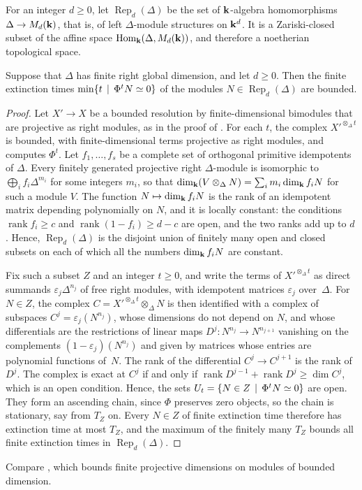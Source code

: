 For an integer ${d\geq0}$, let $\operatorname{Rep}_d(\Delta)$ be the set of
$\mathbf{k}$-algebra homomorphisms ${\Delta\to M_d(\mathbf{k})}$, that is, of left
$\Delta$-module structures on $\mathbf{k}^d$. It is a Zariski-closed subset of the
affine space $\Hom[\kk]{\Delta}{M_d(\kk)}$, and therefore a noetherian
topological space.

\begin{proposition}
  \label{prop:bounded-extinction}
  Suppose that $\Delta$ has finite right global dimension, and let ${d\geq0}$.
  Then the finite extinction times ${\min\set{t}[\Phi^tN\simeq0]}$ of the modules
  ${N\in\operatorname{Rep}_d(\Delta)}$ are bounded.
\end{proposition}

\begin{proof}
  Let ${X'\to X}$ be a bounded resolution by finite-dimensional bimodules that
  are projective as right modules, as in the proof of .
  For each $t$, the complex $X'^{\otimes_\Delta t}$ is bounded, with
  finite-dimensional terms projective as right modules, and computes $\Phi^t$.
  Let $f_1,\dots,f_s$ be a complete set of orthogonal primitive idempotents of
  $\Delta$. Every finitely generated projective right $\Delta$-module is
  isomorphic to $\bigoplus_if_i\Delta^{m_i}$ for some integers $m_i$, so that
  ${\dim_{\mathbf{k}}(V\otimes_\Delta N)}={\sum_im_i\dim_{\mathbf{k}} f_iN}$ for such a module $V$.
  The function ${N}\mapsto{\dim_{\mathbf{k}}f_iN}$ is the rank of an idempotent matrix
  depending polynomially on $N$, and it is locally constant: the conditions
  ${\operatorname{rank}f_i\geq c}$ and ${\operatorname{rank}(1-f_i)\geq d-c}$ are
  open, and the two ranks add up to $d$. Hence, $\operatorname{Rep}_d(\Delta)$
  is the disjoint union of finitely many open and closed subsets on each of
  which all the numbers $\dim_{\mathbf{k}} f_iN$ are constant.

  Fix such a subset $Z$ and an integer ${t\geq0}$, and write the terms of
  $X'^{\otimes_\Delta t}$ as direct summands $\varepsilon_j\Delta^{n_j}$ of free
  right modules, with idempotent matrices $\varepsilon_j$ over~$\Delta$. For
  ${N\in Z}$, the complex ${C=X'^{\otimes_\Delta t}\otimes_\Delta N}$ is then
  identified with a complex of subspaces ${C^j=\varepsilon_j(N^{n_j})}$, whose
  dimensions do not depend on $N$, and whose differentials are the restrictions
  of linear maps ${D^j\colon N^{n_j}\to N^{n_{j+1}}}$ vanishing on the
  complements ${(1-\varepsilon_j)(N^{n_j})}$ and given by matrices whose entries
  are polynomial functions of~$N$. The rank of the differential ${C^j\to
  C^{j+1}}$ is the rank of $D^j$. The complex is exact at $C^j$ if and only if
  ${\operatorname{rank}D^{j-1}+\operatorname{rank}D^j\geq\dim C^j}$, which is an
  open condition. Hence, the sets ${U_t=\set{N\in Z}[\Phi^tN\simeq0]}$ are
  open. They form an ascending chain, since $\Phi$ preserves zero objects, so
  the chain is stationary, say from $T_Z$ on. Every ${N\in Z}$ of finite
  extinction time therefore has extinction time at most $T_Z$, and the maximum
  of the finitely many $T_Z$ bounds all finite extinction times in
  $\operatorname{Rep}_d(\Delta)$.
\end{proof}

Compare , which bounds finite projective dimensions
on modules of bounded dimension.
